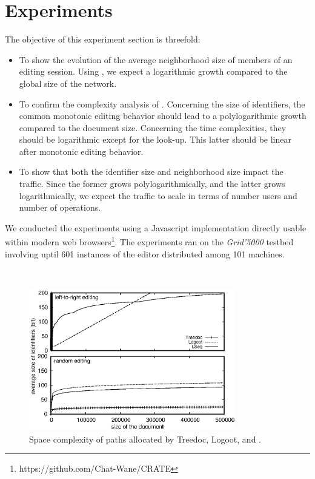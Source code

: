 \section{Experiments}
\label{sec:experiments}

The objective of this experiment section is threefold:
\begin{itemize}
\item To show the evolution of the average neighborhood size of members of an
  editing session. Using \SPRAY, we expect a logarithmic growth compared to the
  global size of the network.
\item To confirm the complexity analysis of \LSEQ. Concerning the size of
  identifiers, the common monotonic editing behavior should lead to a
  polylogarithmic growth compared to the document size. Concerning the time
  complexities, they should be logarithmic except for the look-up. This latter
  should be linear after monotonic editing behavior.
\item To show that both the identifier size and neighborhood size impact the
  traffic. Since the former grows polylogarithmically, and the latter grows
  logarithmically, we expect the traffic to scale in terms of number users and
  number of operations.
\end{itemize}

We conducted the experiments using a Javascript implementation directly usable
within modern web browsers\footnote{https://github.com/Chat-Wane/CRATE}. The
experiments ran on the \emph{Grid'5000} testbed involving uptil 601 instances of
the editor distributed among 101 machines.

\ \\

\begin{figure}
  \centering
  \includegraphics[width=0.8\textwidth]{./img/complexity.eps}
  \caption{\label{fig:complexity} Space complexity of paths allocated by
    Treedoc, Logoot, and \LSEQ.}
\end{figure}

